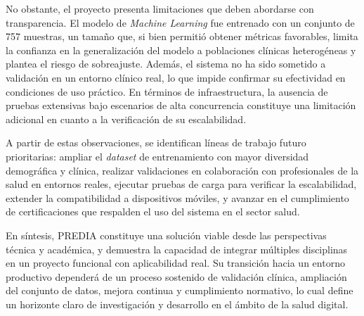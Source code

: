 \documentclass[12pt, letterpaper, twoside]{report}
\begin{document}
No obstante, el proyecto presenta limitaciones que deben abordarse con transparencia. El modelo de \textit{Machine Learning} fue entrenado con un conjunto de 757 muestras, un tamaño que, si bien permitió obtener métricas favorables, limita la confianza en la generalización del modelo a poblaciones clínicas heterogéneas y plantea el riesgo de sobreajuste. Además, el sistema no ha sido sometido a validación en un entorno clínico real, lo que impide confirmar su efectividad en condiciones de uso práctico. En términos de infraestructura, la ausencia de pruebas extensivas bajo escenarios de alta concurrencia constituye una limitación adicional en cuanto a la verificación de su escalabilidad.

A partir de estas observaciones, se identifican líneas de trabajo futuro prioritarias: ampliar el \textit{dataset} de entrenamiento con mayor diversidad demográfica y clínica, realizar validaciones en colaboración con profesionales de la salud en entornos reales, ejecutar pruebas de carga para verificar la escalabilidad, extender la compatibilidad a dispositivos móviles, y avanzar en el cumplimiento de certificaciones que respalden el uso del sistema en el sector salud.

En síntesis, PREDIA constituye una solución viable desde las perspectivas técnica y académica, y demuestra la capacidad de integrar múltiples disciplinas en un proyecto funcional con aplicabilidad real. Su transición hacia un entorno productivo dependerá de un proceso sostenido de validación clínica, ampliación del conjunto de datos, mejora continua y cumplimiento normativo, lo cual define un horizonte claro de investigación y desarrollo en el ámbito de la salud digital.

%
%

\cleardoublepage
{}
{}

\end{document}
